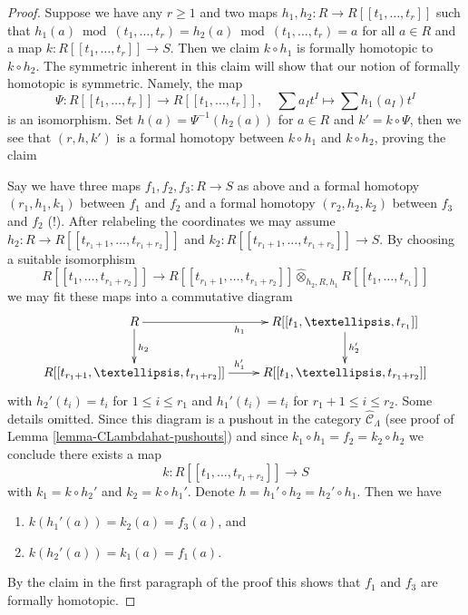 \documentclass{stacks-project}
\theoremstyle{plain}
\theoremstyle{definition}
\theoremstyle{remark}
\numberwithin{equation}{subsection}
\begin{document}
\begin{proof}
Suppose we have any $r \geq 1$ and two maps
$h_1, h_2 : R \to R[[t_1, \ldots, t_r]]$ such that
$h_1(a) \bmod (t_1, \ldots, t_r) =  h_2(a) \bmod (t_1, \ldots, t_r) = a$
for all $a \in R$ and a map $k : R[[t_1, \ldots, t_r]] \to S$.
Then we claim $k \circ h_1$ is formally homotopic to $k \circ h_2$.
The symmetric inherent in this claim will show that our notion
of formally homotopic is symmetric. Namely, the map
$$
\Psi :
R[[t_1, \ldots, t_r]]
\longrightarrow
R[[t_1, \ldots, t_r]],\quad
\sum a_I t^I \longmapsto \sum h_1(a_I)t^I
$$
is an isomorphism. Set $h(a) = \Psi^{-1}(h_2(a))$ for $a \in R$ and
$k' = k \circ \Psi$, then we see that $(r, h, k')$ is a formal
homotopy between $k \circ h_1$ and $k \circ h_2$, proving the claim

\medskip\noindent
Say we have three maps $f_1, f_2, f_3 : R \to S$ as above
and a formal homotopy $(r_1, h_1, k_1)$ between $f_1$ and $f_2$
and a formal homotopy $(r_2, h_2, k_2)$ between $f_3$ and $f_2$ (!).
After relabeling the coordinates we may assume
$h_2 : R \to R[[t_{r_1 + 1}, \ldots, t_{r_1 + r_2}]]$
and
$k_2 : R[[t_{r_1 + 1}, \ldots, t_{r_1 + r_2}]] \to S$.
By choosing a suitable isomorphism
$$
R[[t_1, \ldots, t_{r_1 + r_2}]]
\longrightarrow
R[[t_{r_1 + 1}, \ldots, t_{r_1 + r_2}]]
\widehat{\otimes}_{h_2, R, h_1}
R[[t_1, \ldots, t_{r_1}]]
$$
we may fit these maps into a commutative diagram
$$
\xymatrix{
R \ar[r]_{h_1} \ar[d]^{h_2} &
R[[t_1, \ldots, t_{r_1}]] \ar[d]^{h_2'} \\
R[[t_{r_1 + 1}, \ldots, t_{r_1 + r_2}]] \ar[r]^{h_1'} &
R[[t_1, \ldots, t_{r_1 + r_2}]]
}
$$
with $h_2'(t_i) = t_i$ for $1 \leq i \leq r_1$ and
$h_1'(t_i) = t_i$ for $r_1 + 1 \leq i \leq r_2$.
Some details omitted.
Since this diagram is a pushout in the category
$\widehat{\mathcal{C}}_\Lambda$ (see proof of
Lemma \ref{lemma-CLambdahat-pushouts})
and since $k_1 \circ h_1 = f_2 = k_2 \circ h_2$ we conclude
there exists a map
$$
k : R[[t_1, \ldots, t_{r_1 + r_2}]] \to S
$$
with $k_1 = k \circ h_2'$ and $k_2 = k \circ h_1'$.
Denote $h = h_1' \circ h_2 = h_2' \circ h_1$.
Then we have
\begin{enumerate}
\item $k(h_1'(a)) = k_2(a) = f_3(a)$, and
\item $k(h_2'(a)) = k_1(a) = f_1(a)$.
\end{enumerate}
By the claim in the first paragraph of the proof this shows that
$f_1$ and $f_3$ are formally homotopic.
\end{proof}
\end{document}
